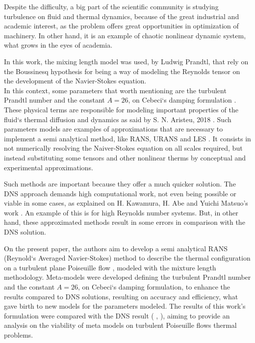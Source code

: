\documentclass[10pt]{article} %
\begin{document}
Despite the difficulty, a big part of the scientific community is studying turbulence on fluid and thermal dynamics, because of the great industrial and academic interest, as the problem offers great opportunities in optimization of machinery. In other hand, it is an example of chaotic nonlinear dynamic system, what grows in the eyes of academia.   

In this work, the mixing length model was used, by Ludwig Prandtl, that rely on the Boussinesq hypothesis for being a way of modeling the Reynolds tensor on the development of the Navier-Stokes equation.\\ 

In this context, some parameters that worth mentioning are the turbulent Prandtl number \cite{Prandtl} and the constant $A = 26$, on Cebeci`s damping formulation \cite{Cebeci}. These physical terms are responsible for modeling important properties of the fluid`s thermal diffusion and dynamics as said by S. N. Aristeu, 2018 \cite{aristeu}. Such parameters models are examples of approximations that are necessary to implement a semi analytical method, like RANS, URANS and LES \cite{aristeu}. It consists in not numerically resolving the Naiver-Stokes equation on all scales required, but instead substituting some tensors and other nonlinear therms by conceptual and experimental approximations.

Such methods are important because they offer a much quicker solution. The DNS approach demands high computational work, not even being possible or viable in some cases, as explained on H. Kawamura, H. Abe and Yuichi Matsuo's work \cite{Abe}. An example of this is for high Reynolds number systems. But, in other hand, these approximated methods result in some errors in comparison with the DNS solution.    

On the present paper, the authors aim to develop a semi analytical RANS (Reynold`s Averaged Navier-Stokes) method to describe the thermal configuration on a turbulent plane Poiseuille flow \cite{Poiseuille}, modeled with the mixture length methodology. Meta-models were developed defining the turbulent Prandtl number \cite{Prandtl} and the constant $A = 26$, on Cebeci`s damping formulation, to enhance the results compared to DNS solutions, resulting on accuracy and efficiency, what gave birth to new models for the parameters modeled. The results of this work's formulation were compared with the DNS result (\cite{DNS1020} , \cite{DNS150}), aiming to provide an analysis on the viability of meta models on turbulent Poiseuille flows thermal problems. \\       
 
\end{document}
